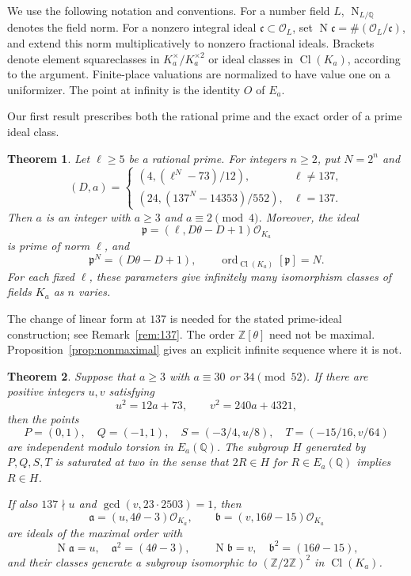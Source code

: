 \documentclass[11pt,leqno,oneside,letterpaper]{amsart}
\newtheorem{theorem}{Theorem}[section]
\theoremstyle{remark}
\numberwithin{equation}{section}
\newcommand{\Q}{\mathbb Q}
\newcommand{\Z}{\mathbb Z}
\DeclareMathOperator{\Cl}{Cl}
\DeclareMathOperator{\Nm}{N}
\DeclareMathOperator{\ord}{ord}
\begin{document}
We use the following notation and conventions. For a number field $L$, $\Nm_{L/\Q}$ denotes the field norm. For a nonzero integral ideal $\mathfrak c\subset\mathcal O_L$, set $\Nm\mathfrak c=\#(\mathcal O_L/\mathfrak c)$, and extend this norm multiplicatively to nonzero fractional ideals. Brackets denote element squareclasses in $K_a^\times/K_a^{\times2}$ or ideal classes in $\Cl(K_a)$, according to the argument. Finite-place valuations are normalized to have value one on a uniformizer. The point at infinity is the identity $O$ of $E_a$.

Our first result prescribes both the rational prime and the exact order of a prime ideal class.

\begin{samepage}
  \begin{theorem}\label{thm:prescribed-prime}
    Let $\ell\geq5$ be a rational prime. For integers $n\geq2$, put $N=2^n$ and
    \[
      (D,a)=
      \begin{cases}
        \left(4,(\ell^N-73)/12\right),     & \ell\ne137, \\[2pt]
        \left(24,(137^N-14353)/552\right), & \ell=137.
      \end{cases}
    \]
    Then $a$ is an integer with $a\geq3$ and $a\equiv2\pmod4$. Moreover, the ideal
    \[
      \mathfrak p=(\ell,D\theta-D+1)\mathcal O_{K_a}
    \]
    is prime of norm $\ell$, and
    \[
      \mathfrak p^N=(D\theta-D+1),\qquad
      \ord_{\Cl(K_a)}[\mathfrak p]=N.
    \]
    For each fixed $\ell$, these parameters give infinitely many isomorphism classes of fields $K_a$ as $n$ varies.
  \end{theorem}
\end{samepage}

The change of linear form at $137$ is needed for the stated prime-ideal construction; see Remark~\ref{rem:137}. The order $\Z[\theta]$ need not be maximal. Proposition~\ref{prop:nonmaximal} gives an explicit infinite sequence where it is not.

\begin{theorem}\label{thm:four-points}
  Suppose that $a\geq3$ with $a\equiv30$ or $34\pmod{52}$. If there are positive integers $u,v$ satisfying
  \begin{equation}\label{eq:two-squares}
    u^2=12a+73,\qquad v^2=240a+4321,
  \end{equation}
  then the points
  \[
    P=(0,1),\quad Q=(-1,1),\quad
    S=(-3/4,u/8),\quad T=(-15/16,v/64)
  \]
  are independent modulo torsion in $E_a(\Q)$. The subgroup $H$ generated by $P,Q,S,T$ is saturated at two in the sense that $2R\in H$ for $R\in E_a(\Q)$ implies $R\in H$.

  If also $137\nmid u$ and $\gcd(v,23\cdot2503)=1$, then
  \[
    \mathfrak a=(u,4\theta-3)\mathcal O_{K_a},\qquad
    \mathfrak b=(v,16\theta-15)\mathcal O_{K_a}
  \]
  are ideals of the maximal order with
  \[
    \Nm\mathfrak a=u,\quad \mathfrak a^2=(4\theta-3),\qquad
    \Nm\mathfrak b=v,\quad \mathfrak b^2=(16\theta-15),
  \]
  and their classes generate a subgroup isomorphic to $(\Z/2\Z)^2$ in $\Cl(K_a)$.
\end{theorem}
\end{document}
